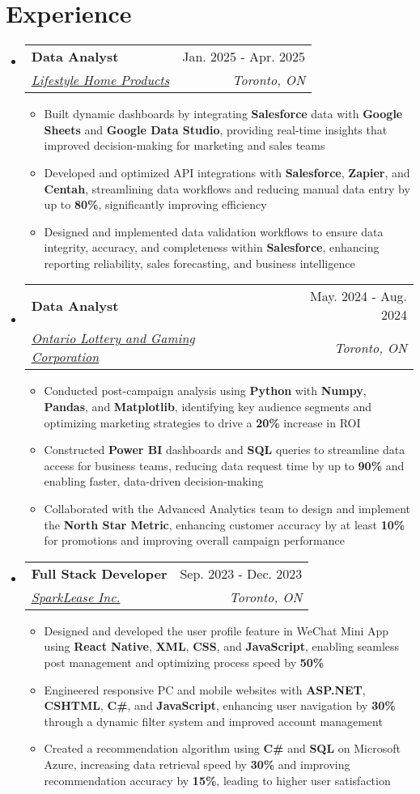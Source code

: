 \documentclass[letterpaper,11pt]{article}
\makeatletter
\newcommand{\resumeItem}[1]{
  \item\small{
    {#1 \vspace{-2pt}}
  }
}
\newcommand{\resumeSubheading}[4]{
  \vspace{-2pt}\item
    \begin{tabular*}{0.97\textwidth}[t]{l@{\extracolsep{\fill}}r}
      \textbf{#1} & #2 \\
      \textit{\small#3} & \textit{\small #4} \\
    \end{tabular*}\vspace{-7pt}
}
\newcommand{\resumeSubHeadingListStart}{\begin{itemize}[leftmargin=0.15in, label={}]}
\newcommand{\resumeSubHeadingListEnd}{\end{itemize}}
\newcommand{\resumeItemListStart}{\begin{itemize}}
\newcommand{\resumeItemListEnd}{\end{itemize}\vspace{-5pt}}
\makeatother
\begin{document}
\section{Experience}
  \resumeSubHeadingListStart
    \resumeSubheading
      {Data Analyst}{Jan. 2025 - Apr. 2025}
      {\href{https://lifestylesunrooms.com/}{Lifestyle Home Products}}{Toronto, ON}
      \resumeItemListStart
        \resumeItem{Built dynamic dashboards by integrating \textbf{Salesforce} data with \textbf{Google Sheets} and \textbf{Google Data Studio}, providing real-time insights that improved decision-making for marketing and sales teams} 
        \resumeItem{Developed and optimized API integrations with \textbf{Salesforce}, \textbf{Zapier}, and \textbf{Centah}, streamlining data workflows and reducing manual data entry by up to \textbf{80\%}, significantly improving efficiency}
        \resumeItem{Designed and implemented data validation workflows to ensure data integrity, accuracy, and completeness within \textbf{Salesforce}, enhancing reporting reliability, sales forecasting, and business intelligence}
      \resumeItemListEnd

    \resumeSubheading
      {Data Analyst}{May. 2024 - Aug. 2024}
      {\href{https://www.olg.ca/en/home.html}{Ontario Lottery and Gaming Corporation}}{Toronto, ON}
      \resumeItemListStart
        \resumeItem{Conducted post-campaign analysis using \textbf{Python} with \textbf{Numpy}, \textbf{Pandas}, and \textbf{Matplotlib}, identifying key audience segments and optimizing marketing strategies to drive a \textbf{20\%} increase in ROI}
        \resumeItem{Constructed \textbf{Power BI} dashboards and \textbf{SQL} queries to streamline data access for business teams, reducing data request time by up to \textbf{90\%} and enabling faster, data-driven decision-making}
        \resumeItem{Collaborated with the Advanced Analytics team to design and implement the \textbf{North Star Metric}, enhancing customer accuracy by at least \textbf{10\%} for promotions and improving overall campaign performance}
      \resumeItemListEnd

    \resumeSubheading
      {Full Stack Developer}{Sep. 2023 - Dec. 2023}
      {\href{https://www.sparklease.com/en/Home/Index}{SparkLease Inc.}}{Toronto, ON}
      \resumeItemListStart
        \resumeItem{Designed and developed the user profile feature in WeChat Mini App using \textbf{React Native}, \textbf{XML}, \textbf{CSS}, and \textbf{JavaScript}, enabling seamless post management and optimizing process speed by \textbf{50\%}}
        \resumeItem{Engineered responsive PC and mobile websites with \textbf{ASP.NET}, \textbf{CSHTML}, \textbf{C\#}, and \textbf{JavaScript}, enhancing user navigation by \textbf{30\%} through a dynamic filter system and improved account management}
        \resumeItem{Created a recommendation algorithm using \textbf{C\#} and \textbf{SQL} on Microsoft Azure, increasing data retrieval speed by \textbf{30\%} and improving recommendation accuracy by \textbf{15\%}, leading to higher user satisfaction}
      \resumeItemListEnd
  \resumeSubHeadingListEnd
\end{document}
